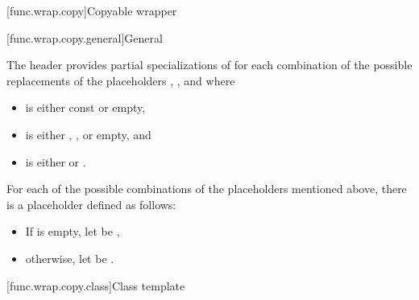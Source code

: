 [func.wrap.copy]{Copyable wrapper}

[func.wrap.copy.general]{General}

\pnum
The header provides partial specializations of  for each combination of the possible replacements of the placeholders \cv{}, , and  where
\begin{itemize}
\item \cv{} is either const or empty,
\item {} is either \tcode{\&}, \tcode{\&\&}, or empty, and
\item {} is either  or .
\end{itemize}

\pnum
For each of the possible combinations of the placeholders mentioned above, there is a placeholder  defined as follows:
\begin{itemize}
\item If  is empty, let  be \cv{}\tcode{\&},
\item otherwise, let  be \cv{} .
\end{itemize}

[func.wrap.copy.class]{Class template }

